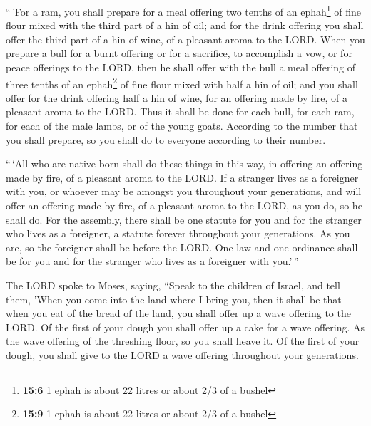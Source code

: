  ``\,'For a ram, you shall prepare for a meal offering two
tenths of an ephah\footnote{\textbf{15:6} 1 ephah is about 22 litres or
  about 2/3 of a bushel} of fine flour mixed with the third part of a
hin of oil;  and for the drink offering you shall offer
the third part of a hin of wine, of a pleasant aroma to the LORD.
 When you prepare a bull for a burnt offering or for a
sacrifice, to accomplish a vow, or for peace offerings to the LORD,
 then he shall offer with the bull a meal offering of
three tenths of an ephah\footnote{\textbf{15:9} 1 ephah is about 22
  litres or about 2/3 of a bushel} of fine flour mixed with half a hin
of oil;  and you shall offer for the drink offering half
a hin of wine, for an offering made by fire, of a pleasant aroma to the
LORD.  Thus it shall be done for each bull, for each ram,
for each of the male lambs, or of the young goats. 
According to the number that you shall prepare, so you shall do to
everyone according to their number.

 ``\,`All who are native-born shall do these things in
this way, in offering an offering made by fire, of a pleasant aroma to
the LORD.  If a stranger lives as a foreigner with you,
or whoever may be amongst you throughout your generations, and will
offer an offering made by fire, of a pleasant aroma to the LORD, as you
do, so he shall do.  For the assembly, there shall be one
statute for you and for the stranger who lives as a foreigner, a statute
forever throughout your generations. As you are, so the foreigner shall
be before the LORD.  One law and one ordinance shall be
for you and for the stranger who lives as a foreigner with you.'\,''

 The LORD spoke to Moses, saying,  ``Speak
to the children of Israel, and tell them, 'When you come into the land
where I bring you,  then it shall be that when you eat of
the bread of the land, you shall offer up a wave offering to the LORD.
 Of the first of your dough you shall offer up a cake for
a wave offering. As the wave offering of the threshing floor, so you
shall heave it.  Of the first of your dough, you shall
give to the LORD a wave offering throughout your generations.

